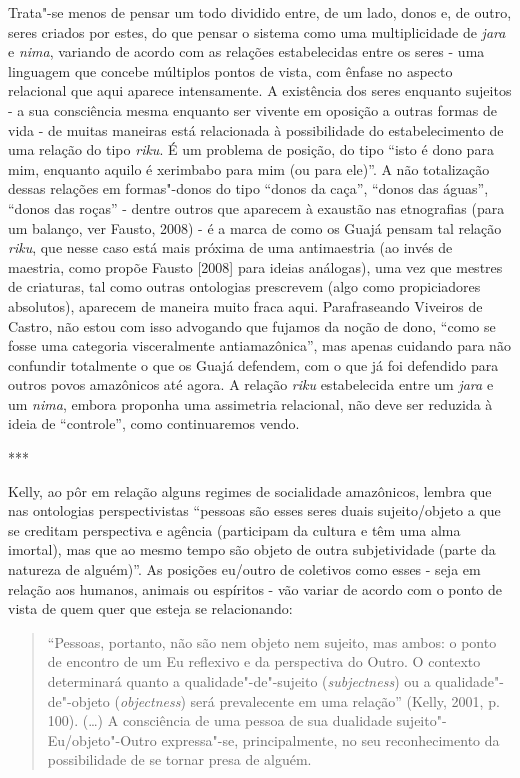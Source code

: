 Trata"-se menos de pensar um todo dividido entre, de um lado, donos e, de
outro, seres criados por estes, do que pensar o sistema como uma
multiplicidade de \emph{jara} e \emph{nima}, variando de acordo com as
relações estabelecidas entre os seres - uma linguagem que concebe
múltiplos pontos de vista, com ênfase no aspecto relacional que aqui
aparece intensamente. A existência dos seres enquanto sujeitos - a sua
consciência mesma enquanto ser vivente em oposição a outras formas de
vida - de muitas maneiras está relacionada à possibilidade do
estabelecimento de uma relação do tipo \emph{riku}. É um problema de
posição, do tipo ``isto é dono para mim, enquanto aquilo é xerimbabo
para mim (ou para ele)''. A não totalização dessas relações em
formas"-donos do tipo ``donos da caça'', ``donos das águas'', ``donos das
roças'' - dentre outros que aparecem à exaustão nas etnografias (para um
balanço, ver Fausto, 2008) - é a marca de como os Guajá pensam tal
relação \emph{riku}, que nesse caso está mais próxima de uma
antimaestria (ao invés de maestria, como propõe Fausto {[}2008{]} para
ideias análogas), uma vez que mestres de criaturas, tal como outras
ontologias prescrevem (algo como propiciadores absolutos), aparecem de
maneira muito fraca aqui. Parafraseando Viveiros de Castro, não estou
com isso advogando que fujamos da noção de dono, ``como se fosse uma
categoria visceralmente antiamazônica'', mas apenas cuidando para não
confundir totalmente o que os Guajá defendem, com o que já foi defendido
para outros povos amazônicos até agora. A relação \emph{riku}
estabelecida entre um \emph{jara} e um \emph{nima}, embora proponha uma
assimetria relacional, não deve ser reduzida à ideia de ``controle'', como
continuaremos vendo.

\begin{center}
***
\end{center}

Kelly, ao pôr em relação alguns regimes de socialidade amazônicos,
lembra que nas ontologias perspectivistas ``pessoas são esses seres duais
sujeito/objeto a que se creditam perspectiva e agência (participam da
cultura e têm uma alma imortal), mas que ao mesmo tempo são objeto de
outra subjetividade (parte da natureza de alguém)''. As posições eu/outro
de coletivos como esses - seja em relação aos humanos, animais ou
espíritos - vão variar de acordo com o ponto de vista de quem quer que
esteja se relacionando:

\begin{quote}
``Pessoas, portanto, não são nem objeto nem sujeito, mas ambos: o ponto
 de encontro de um Eu reflexivo e da perspectiva do Outro. O contexto
 determinará quanto a qualidade"-de"-sujeito (\emph{subjectness}) ou a
 qualidade"-de"-objeto (\emph{objectness}) será prevalecente em uma
 relação'' (Kelly, 2001, p. 100). (\ldots{}) A consciência de uma pessoa de sua
dualidade sujeito"-Eu/objeto"-Outro expressa"-se, principalmente, no seu
reconhecimento da possibilidade de se tornar presa de alguém.
\end{quote}

